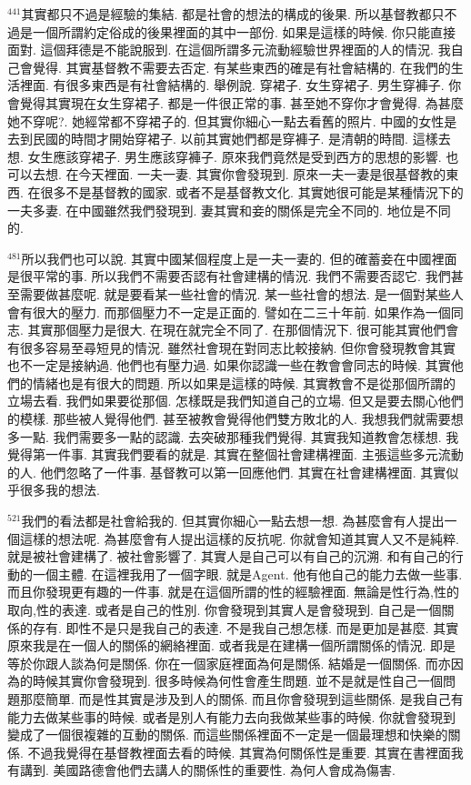 \documentclass{book}
\begin{document}
$^{441}$其實都只不過是經驗的集結.
都是社會的想法的構成的後果.
所以基督教都只不過是一個所謂約定俗成的後果裡面的其中一部份.
如果是這樣的時候.
你只能直接面對.
這個拜德是不能說服到.
在這個所謂多元流動經驗世界裡面的人的情況.
我自己會覺得.
其實基督教不需要去否定.
有某些東西的確是有社會結構的.
在我們的生活裡面.
有很多東西是有社會結構的.
舉例說.
穿裙子.
女生穿裙子.
男生穿褲子.
你會覺得其實現在女生穿裙子.
都是一件很正常的事.
甚至她不穿你才會覺得.
為甚麼她不穿呢?.
她經常都不穿裙子的.
但其實你細心一點去看舊的照片.
中國的女性是去到民國的時間才開始穿裙子.
以前其實她們都是穿褲子.
是清朝的時間.
這樣去想.
女生應該穿裙子.
男生應該穿褲子.
原來我們竟然是受到西方的思想的影響.
也可以去想.
在今天裡面.
一夫一妻.
其實你會發現到.
原來一夫一妻是很基督教的東西.
在很多不是基督教的國家.
或者不是基督教文化.
其實她很可能是某種情況下的一夫多妻.
在中國雖然我們發現到.
妻其實和妾的關係是完全不同的.
地位是不同的.

$^{481}$所以我們也可以說.
其實中國某個程度上是一夫一妻的.
但的確蓄妾在中國裡面是很平常的事.
所以我們不需要否認有社會建構的情況.
我們不需要否認它.
我們甚至需要做甚麼呢.
就是要看某一些社會的情況.
某一些社會的想法.
是一個對某些人會有很大的壓力.
而那個壓力不一定是正面的.
譬如在二三十年前.
如果作為一個同志.
其實那個壓力是很大.
在現在就完全不同了.
在那個情況下.
很可能其實他們會有很多容易至尋短見的情況.
雖然社會現在對同志比較接納.
但你會發現教會其實也不一定是接納過.
他們也有壓力過.
如果你認識一些在教會會同志的時候.
其實他們的情緒也是有很大的問題.
所以如果是這樣的時候.
其實教會不是從那個所謂的立場去看.
我們如果要從那個.
怎樣既是我們知道自己的立場.
但又是要去關心他們的模樣.
那些被人覺得他們.
甚至被教會覺得他們雙方敗北的人.
我想我們就需要想多一點.
我們需要多一點的認識.
去突破那種我們覺得.
其實我知道教會怎樣想.
我覺得第一件事.
其實我們要看的就是.
其實在整個社會建構裡面.
主張這些多元流動的人.
他們忽略了一件事.
基督教可以第一回應他們.
其實在社會建構裡面.
其實似乎很多我的想法.

$^{521}$我們的看法都是社會給我的.
但其實你細心一點去想一想.
為甚麼會有人提出一個這樣的想法呢.
為甚麼會有人提出這樣的反抗呢.
你就會知道其實人又不是純粹.
就是被社會建構了.
被社會影響了.
其實人是自己可以有自己的沉溯.
和有自己的行動的一個主體.
在這裡我用了一個字眼.
就是Agent.
他有他自己的能力去做一些事.
而且你發現更有趣的一件事.
就是在這個所謂的性的經驗裡面.
無論是性行為,性的取向,性的表達.
或者是自己的性別.
你會發現到其實人是會發現到.
自己是一個關係的存有.
即性不是只是我自己的表達.
不是我自己想怎樣.
而是更加是甚麼.
其實原來我是在一個人的關係的網絡裡面.
或者我是在建構一個所謂關係的情況.
即是等於你跟人談為何是關係.
你在一個家庭裡面為何是關係.
結婚是一個關係.
而亦因為的時候其實你會發現到.
很多時候為何性會產生問題.
並不是就是性自己一個問題那麼簡單.
而是性其實是涉及到人的關係.
而且你會發現到這些關係.
是我自己有能力去做某些事的時候.
或者是別人有能力去向我做某些事的時候.
你就會發現到變成了一個很複雜的互動的關係.
而這些關係裡面不一定是一個最理想和快樂的關係.
不過我覺得在基督教裡面去看的時候.
其實為何關係性是重要.
其實在書裡面我有講到.
美國路德會他們去講人的關係性的重要性.
為何人會成為傷害.
\end{document}
